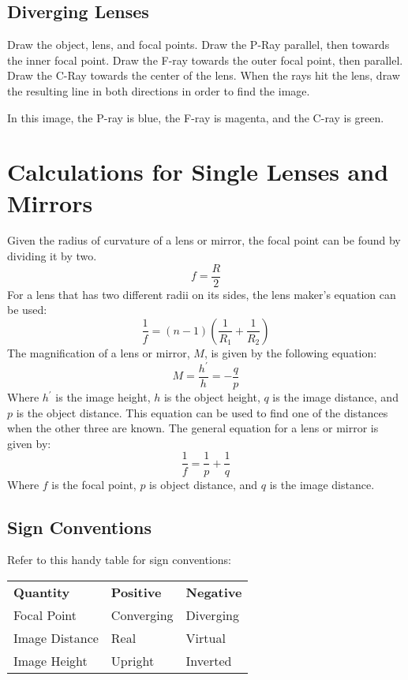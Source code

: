 \documentclass{article}
\begin{document}
\subsection{Diverging Lenses}
Draw the object, lens, and focal points.  Draw the P-Ray parallel, then towards the inner focal point.  Draw the F-ray towards the outer focal point, then parallel.  Draw the C-Ray towards the center of the lens.  When the rays hit the lens, draw the resulting line in both directions in order to find the image.
\newline
{}
\newline
In this image, the P-ray is blue, the F-ray is magenta, and the C-ray is green.
\section{Calculations for Single Lenses and Mirrors}
Given the radius of curvature of a lens or mirror, the focal point can be found by dividing it by two.
\[f=\frac{R}{2}\]
For a lens that has two different radii on its sides, the lens maker's equation can be used:
\[\frac{1}{f}=(n-1)\left(\frac{1}{R_1}+\frac{1}{R_2}\right)\]
The magnification of a lens or mirror, $M$, is given by the following equation:
\[M=\frac{h^\prime}{h}=-\frac{q}{p}\]
Where $h^\prime$ is the image height, $h$ is the object height, $q$ is the image distance, and $p$ is the object distance.  This equation can be used to find one of the distances when the other three are known.
\newline
The general equation for a lens or mirror is given by:
\[\frac{1}{f}=\frac{1}{p}+\frac{1}{q}\]
Where $f$ is the focal point, $p$ is object distance, and $q$ is the image distance.
\subsection{Sign Conventions}
Refer to this handy table for sign conventions:
\newline\newline
\begin{tabular}{|l l l|}
  \textbf{Quantity} & \textbf{Positive} & \textbf{Negative} \\
  Focal Point & Converging & Diverging \\
  Image Distance & Real & Virtual \\
  Image Height & Upright & Inverted
\end{tabular}
\end{document}
